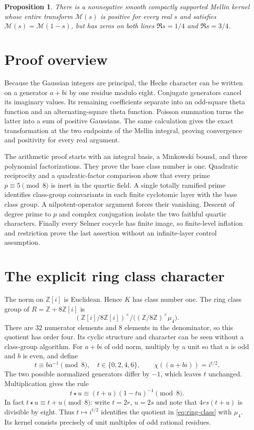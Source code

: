 \documentclass[11pt]{article}
\newtheorem{proposition}[theorem]{Proposition}
\newcommand{\Z}{\mathbb Z}
\begin{document}
\begin{proposition}\label{prop:kernel-limit}
There is a nonnegative smooth compactly supported Mellin kernel whose
entire transform $\mathcal M(s)$ is positive for every real $s$ and
satisfies $\mathcal M(s)=\mathcal M(1-s)$, but has zeros on both lines
$\Re s=1/4$ and $\Re s=3/4$.
\end{proposition}

\section*{Proof overview}

Because the Gaussian integers are principal, the Hecke character can be
written on a generator $a+bi$ by one residue modulo eight. Conjugate
generators cancel its imaginary values. Its remaining coefficients
separate into an odd-square theta function and an alternating-square
theta function. Poisson summation turns the latter into a sum of positive
Gaussians. The same calculation gives the exact transformation at the
two endpoints of the Mellin integral, proving convergence and positivity
for every real argument.

The arithmetic proof starts with an integral basis, a Minkowski bound,
and three polynomial factorizations. They prove the base class number
is one. Quadratic reciprocity and a quadratic-factor comparison show
that every prime $p\equiv5\pmod8$ is inert in the quartic field.
A single totally ramified prime identifies
class-group coinvariants in each finite cyclotomic layer with the base
class group. A nilpotent-operator argument forces their vanishing.
Descent of degree prime to $p$ and complex conjugation isolate the two faithful
quartic characters. Finally every Selmer cocycle has finite image, so
finite-level inflation and restriction prove the last assertion without
an infinite-layer control assumption.

\section{The explicit ring class character}

The norm on $\Z[i]$ is Euclidean. Hence $K$ has class number one.
The ring class group of $R=\Z+8\Z[i]$ is
\[
 (\Z[i]/8\Z[i])^\times\big/
 \bigl((\Z/8\Z)^\times\mu_4\bigr).
 \tag{8}\label{eq:ring-class}
\]
There are $32$ numerator elements and $8$ elements in the denominator,
so this quotient has order four. Its cyclic structure and character can
be seen without a class-group algorithm. For $a+bi$ of odd norm,
multiply by a unit so that $a$ is odd and $b$ is even, and define
\[
 t\equiv ba^{-1}\pmod8,\quad t\in\{0,2,4,6\},\qquad
 \chi((a+bi))=i^{t/2}.
 \tag{9}\label{eq:character}
\]
The two possible normalized generators differ by $-1$, which leaves
$t$ unchanged. Multiplication gives the rule
\[
 t\star u\equiv(t+u)(1-tu)^{-1}\pmod8.
 \tag{10}\label{eq:law}
\]
In fact $t\star u\equiv t+u\pmod8$: write $t=2r$, $u=2s$ and note
that $4rs(t+u)$ is divisible by eight. Thus
$t\mapsto i^{t/2}$ identifies the quotient in \eqref{eq:ring-class}
with $\mu_4$. Its kernel consists precisely of unit multiples of odd
rational residues.
\end{document}
